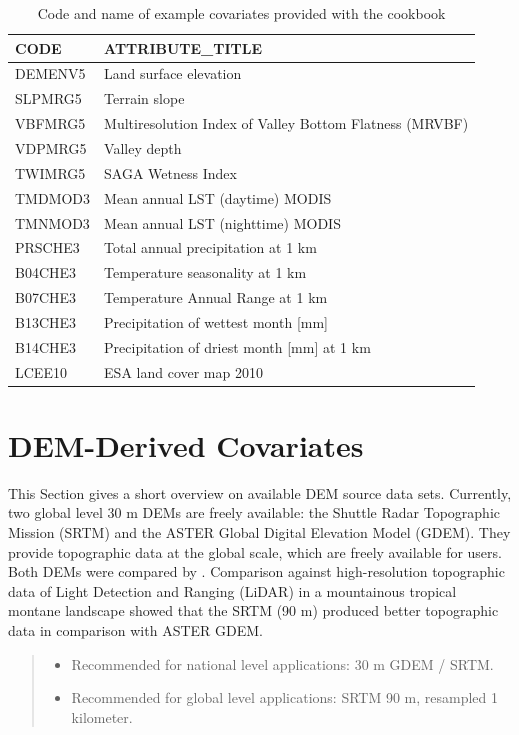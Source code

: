 \documentclass[10pt,b5paper,]{book}
\providecommand{\tightlist}{%
  \setlength{\itemsep}{0pt}\setlength{\parskip}{0pt}}
\theoremstyle{definition}
\theoremstyle{definition}
\theoremstyle{definition}
\theoremstyle{remark}
\begin{document}
\begin{table}

\caption{\label{tab:covariates}Code and name of example covariates provided with the cookbook}
\centering
\begin{tabular}[t]{ll}
\toprule
CODE & ATTRIBUTE\_TITLE\\
\midrule
DEMENV5 & Land surface elevation\\
SLPMRG5 & Terrain slope\\
VBFMRG5 & Multiresolution Index of Valley Bottom Flatness (MRVBF)\\
VDPMRG5 & Valley depth\\
TWIMRG5 & SAGA Wetness Index\\
\addlinespace
TMDMOD3 & Mean annual LST (daytime) MODIS\\
TMNMOD3 & Mean annual LST (nighttime) MODIS\\
PRSCHE3 & Total annual precipitation at 1 km\\
B04CHE3 & Temperature seasonality at 1 km\\
B07CHE3 & Temperature Annual Range at 1 km\\
\addlinespace
B13CHE3 & Precipitation of wettest month [mm]\\
B14CHE3 & Precipitation of driest month [mm] at 1 km\\
LCEE10 & ESA land cover map 2010\\
\bottomrule
\end{tabular}
\end{table}

\hypertarget{dem-derived-covariates}{%
\section{DEM-Derived Covariates}\label{dem-derived-covariates}}

This Section gives a short overview on available DEM source data sets.
Currently, two global level 30 m DEMs are freely available: the Shuttle
Radar Topographic Mission (SRTM) and the ASTER Global Digital Elevation
Model (GDEM). They provide topographic data at the global scale, which
are freely available for users. Both DEMs were compared by
\citet{Wong2014}. Comparison against high-resolution topographic data of
Light Detection and Ranging (LiDAR) in a mountainous tropical montane
landscape showed that the SRTM (90 m) produced better topographic data
in comparison with ASTER GDEM.

\begin{quote}
\begin{itemize}
\tightlist
\item
  Recommended for national level applications: 30 m GDEM / SRTM.
\item
  Recommended for global level applications: SRTM 90 m, resampled 1
  kilometer.
\end{itemize}
\end{quote}
\end{document}
